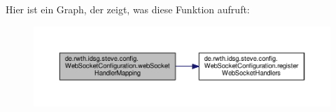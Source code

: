 Hier ist ein Graph, der zeigt, was diese Funktion aufruft\+:\nopagebreak
\begin{figure}[H]
\begin{center}
\leavevmode
\includegraphics[width=350pt]{classde_1_1rwth_1_1idsg_1_1steve_1_1config_1_1_web_socket_configuration_ae4bdb11cf22e1d830dbde50f33f101aa_cgraph}
\end{center}
\end{figure}




